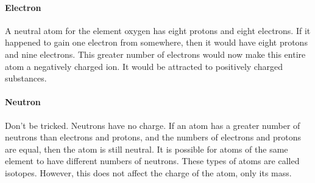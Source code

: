 \paragraph{Electron} A neutral atom for the element oxygen has eight protons and eight electrons. If it happened to gain one electron from somewhere, then it would have eight protons and nine electrons. This greater number of electrons would now make this entire atom a negatively charged ion. It would be attracted to positively charged substances.

\paragraph{Neutron} Don't be tricked. Neutrons have no charge. If an atom has a greater number of neutrons than electrons and protons, and the numbers of electrons and protons are equal, then the atom is still neutral. It is possible for atoms of the same element to have different numbers of neutrons. These types of atoms are called isotopes. However, this does not affect the charge of the atom, only its mass.

\newpage
